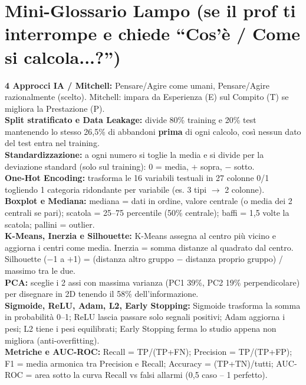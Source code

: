 \documentclass[10pt, a4paper]{article}
\begin{document}
\noindent\begin{minipage}{\linewidth}
\section*{Mini-Glossario Lampo (se il prof ti interrompe e chiede ``Cos'è / Come si calcola...?'')}
\noindent\colorbox{PassBox}{\parbox{\dimexpr\linewidth-2\fboxsep}{\raggedright\small
\textbf{\color{PrimaryNavy}4 Approcci IA / Mitchell:} Pensare/Agire come umani, Pensare/Agire razionalmente (scelto). Mitchell: impara da Esperienza (E) sul Compito (T) se migliora la Prestazione (P).\\[2.5pt]
\textbf{\color{PrimaryNavy}Split stratificato e Data Leakage:} divide 80\% training e 20\% test mantenendo lo stesso 26,5\% di abbandoni \textbf{prima} di ogni calcolo, così nessun dato del test entra nel training.\\[2.5pt]
\textbf{\color{PrimaryNavy}Standardizzazione:} a ogni numero si toglie la media e si divide per la deviazione standard (solo sul training): 0 = media, $+$ sopra, $-$ sotto.\\[2.5pt]
\textbf{\color{PrimaryNavy}One-Hot Encoding:} trasforma le 16 variabili testuali in 27 colonne 0/1 togliendo 1 categoria ridondante per variabile (es. 3 tipi $\rightarrow$ 2 colonne).\\[2.5pt]
\textbf{\color{PrimaryNavy}Boxplot e Mediana:} mediana = dati in ordine, valore centrale (o media dei 2 centrali se pari); scatola = 25\textdegree{}--75\textdegree{} percentile (50\% centrale); baffi = 1,5 volte la scatola; pallini = outlier.\\[2.5pt]
\textbf{\color{PrimaryNavy}K-Means, Inerzia e Silhouette:} K-Means assegna al centro più vicino e aggiorna i centri come media. Inerzia = somma distanze al quadrato dal centro. Silhouette ($-$1 a $+$1) = (distanza altro gruppo $-$ distanza proprio gruppo) / massimo tra le due.\\[2.5pt]
\textbf{\color{PrimaryNavy}PCA:} sceglie i 2 assi con massima varianza (PC1 39\%, PC2 19\% perpendicolare) per disegnare in 2D tenendo il 58\% dell'informazione.\\[2.5pt]
\textbf{\color{PrimaryNavy}Sigmoide, ReLU, Adam, L2, Early Stopping:} Sigmoide trasforma la somma in probabilità 0--1; ReLU lascia passare solo segnali positivi; Adam aggiorna i pesi; L2 tiene i pesi equilibrati; Early Stopping ferma lo studio appena non migliora (anti-overfitting).\\[2.5pt]
\textbf{\color{PrimaryNavy}Metriche e AUC-ROC:} Recall = TP/(TP+FN); Precision = TP/(TP+FP); F1 = media armonica tra Precision e Recall; Accuracy = (TP+TN)/tutti; AUC-ROC = area sotto la curva Recall vs falsi allarmi (0,5 caso -- 1 perfetto).\\[2.5pt]
}}
\end{minipage}
\end{document}
